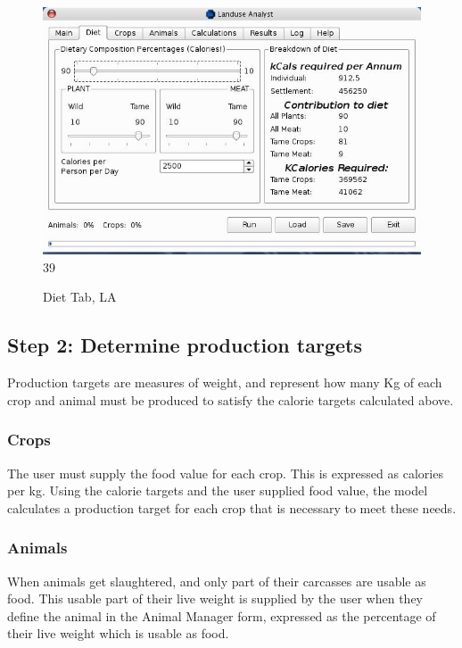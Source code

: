 \begin{figure}[htbp]
  \label{fig:LADiet}%
    \includegraphics[scale=.355]{./images/LanduseAnalystDiet545.jpg}
39
  \caption{ Diet Tab, LA}
\end{figure}

\subsection{Step 2: Determine production targets}
  Production targets are measures of weight, and represent how many Kg of each
  crop and animal must be produced to satisfy the calorie targets calculated
  above.

  \subsubsection{Crops}
The user must supply the food value for each crop.  This is expressed as
calories per kg.  Using the calorie targets and the user supplied food value,
the model calculates a production target for each crop that is necessary to
meet these needs.

  \subsubsection{Animals}
When animals get slaughtered, and only part of their carcasses are usable as
food.  This usable part of their live weight is supplied by the user when they
define the animal in the Animal Manager form, expressed as the percentage of
their live weight which is usable as food.

